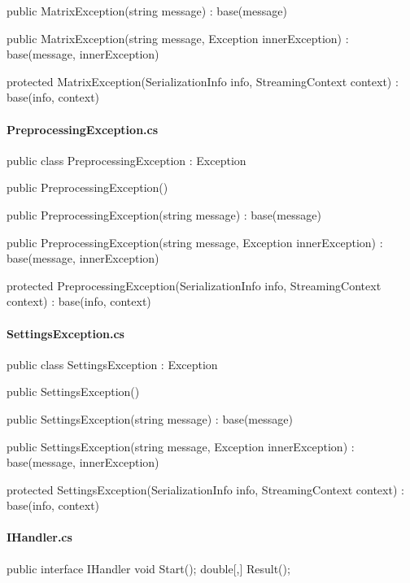 \begin{flushleft}
\begin{cscode}
{    public MatrixException(string message) : base(message)
    {
    }

    public MatrixException(string message, Exception innerException) : base(message, innerException)
    {
    }

    protected MatrixException(SerializationInfo info, StreamingContext context) : base(info, context)
    {
    }
}
    \end{cscode}
    
    \paragraph{PreprocessingException.cs}
    \begin{cscode}
[Serializable]
public class PreprocessingException : Exception
{
    public PreprocessingException()
    {
    }

    public PreprocessingException(string message) : base(message)
    {
    }

    public PreprocessingException(string message, Exception innerException) : base(message, innerException)
    {
    }

    protected PreprocessingException(SerializationInfo info, StreamingContext context) : base(info, context)
    {
    }
}
    \end{cscode}
    
    \paragraph{SettingsException.cs}
    \begin{cscode}
[Serializable]
public class SettingsException : Exception
{
    public SettingsException()
    {
    }

    public SettingsException(string message) : base(message)
    {
    }

    public SettingsException(string message, Exception innerException) : base(message, innerException)
    {
    }

    protected SettingsException(SerializationInfo info, StreamingContext context) : base(info, context)
    {
    }
}
    \end{cscode}
    
    
    \paragraph{IHandler.cs}
    \begin{cscode}
public interface IHandler
{
    void Start();
    double[,] Result();
}
    \end{cscode}
    

\end{flushleft}
